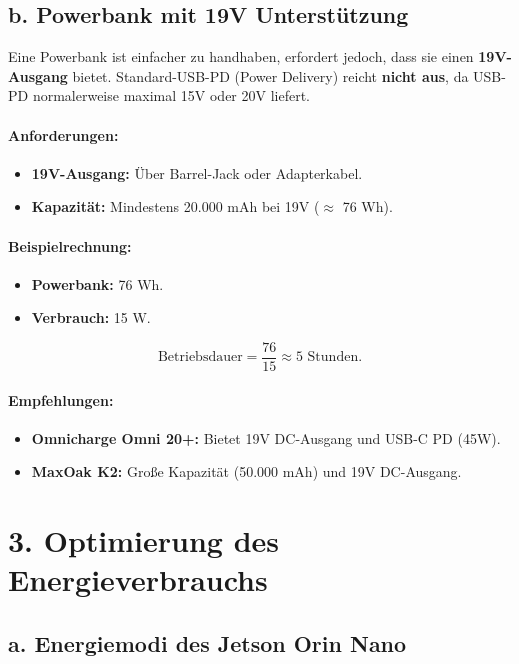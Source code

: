 \documentclass[a4paper,12pt]{article}
\begin{document}
\subsection*{b. Powerbank mit 19V Unterstützung}

Eine Powerbank ist einfacher zu handhaben, erfordert jedoch, dass sie einen \textbf{19V-Ausgang} bietet. Standard-USB-PD (Power Delivery) reicht \textbf{nicht aus}, da USB-PD normalerweise maximal 15V oder 20V liefert.

\paragraph{Anforderungen:}
\begin{itemize}
    \item \textbf{19V-Ausgang:} Über Barrel-Jack oder Adapterkabel.
    \item \textbf{Kapazität:} Mindestens 20.000 mAh bei 19V ($\approx$ 76 Wh).
\end{itemize}

\paragraph{Beispielrechnung:}
\begin{itemize}
    \item \textbf{Powerbank:} 76 Wh.
    \item \textbf{Verbrauch:} 15 W.
\end{itemize}
\[
    \text{Betriebsdauer} = \frac{76}{15} \approx 5 \text{ Stunden.}
\]

\paragraph{Empfehlungen:}
\begin{itemize}
    \item \textbf{Omnicharge Omni 20+:} Bietet 19V DC-Ausgang und USB-C PD (45W).
    \item \textbf{MaxOak K2:} Große Kapazität (50.000 mAh) und 19V DC-Ausgang.
\end{itemize}

\section*{3. Optimierung des Energieverbrauchs}

\subsection*{a. Energiemodi des Jetson Orin Nano}
\end{document}

